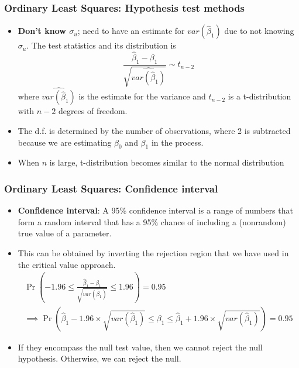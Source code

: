 \documentclass[aspectratio=169]{beamer}
\begin{document}
\begin{frame}
\frametitle{Ordinary Least Squares: Hypothesis test methods}

\begin{itemize}
\item \textbf{Don't know $\sigma_u$}; need to have an estimate for $var(\hat{\beta}_1)$ due to not knowing $\sigma_u$. The test statistics and its distribution is
\[
\frac{\hat{\beta}_1-\beta_1}{\sqrt{\widehat{var(\hat{\beta}_1)}}}\sim t_{n-2}
\]
where $\widehat{var(\hat{\beta}_1)}$ is the estimate for the variance and $t_{n-2}$ is a t-distribution with $n-2$ degrees of freedom.
\item The d.f. is determined by the number of observations, where 2 is subtracted because we are estimating $\beta_0$ and $\beta_1$ in the process.
\item When $n$ is large, t-distribution becomes similar to the normal distribution
\end{itemize}
\end{frame}

\begin{frame}
\frametitle{Ordinary Least Squares: Confidence interval}

\begin{itemize}
\item  \textbf{Confidence interval}: A 95\% confidence interval is a range of numbers that form a random interval that has a 95\% chance of including a (nonrandom) true value of a parameter. 
\item This can be obtained by inverting the rejection region that we have used in the critical value approach.
\footnotesize{\begin{gather*}
\Pr\left(-1.96\leq \frac{\hat{\beta}_1-\beta_1}{\sqrt{var(\hat{\beta}_1)}} \leq1.96\right)=0.95\\
\implies \Pr\left(\hat{\beta}_1-1.96\times\sqrt{var(\hat{\beta}_1)} \leq \beta_1 \leq\hat{\beta}_1+1.96\times\sqrt{var(\hat{\beta}_1)}\right)=0.95
\end{gather*}}\normalsize
\item  If they encompass the null test value, then we cannot reject the null hypothesis. Otherwise, we can reject the null. 
\end{itemize}
\end{frame}
\end{document}
